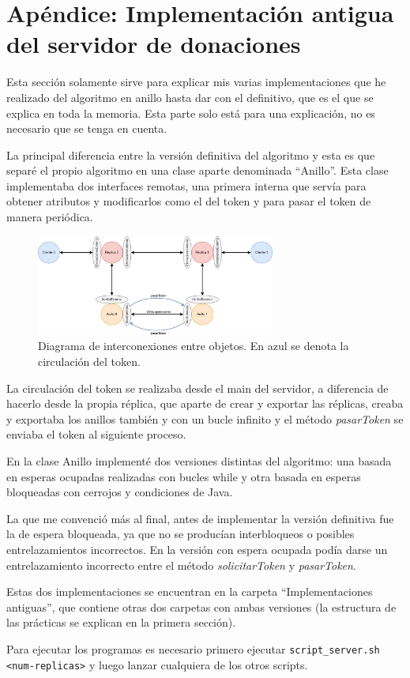 \documentclass{article}
\begin{document}
\newpage

\section{Apéndice: Implementación antigua del servidor de donaciones}
Esta sección solamente sirve para explicar mis varias implementaciones que he realizado del algoritmo en anillo hasta dar con el definitivo, que es el que se explica en toda la memoria. Esta parte solo está para una explicación, no es necesario que se tenga en cuenta.

\bigskip

La principal diferencia entre la versión definitiva del algoritmo y esta es que separé el propio algoritmo en una clase aparte denominada ``Anillo''. Esta clase implementaba dos interfaces remotas, una primera interna que servía para obtener atributos y modificarlos como el del token y para pasar el token de manera periódica.

\begin{figure}[H]
    \centering
    \includegraphics[width=0.7\textwidth]{imagenes/diagramaAnillosSeparados.png}
    \caption{Diagrama de interconexiones entre objetos. En azul se denota la circulación del token.}
\end{figure}

La circulación del token se realizaba desde el main del servidor, a diferencia de hacerlo desde la propia réplica, que aparte de crear y exportar las réplicas, creaba y exportaba los anillos también y con un bucle infinito y el método \textit{pasarToken} se enviaba el token al siguiente proceso.

\bigskip

En la clase Anillo implementé dos versiones distintas del algoritmo: una basada en esperas ocupadas realizadas con bucles while y otra basada en esperas bloqueadas con cerrojos y condiciones de Java.

\bigskip

La que me convenció más al final, antes de implementar la versión definitiva fue la de espera bloqueada, ya que no se producían interbloqueos o posibles entrelazamientos incorrectos. En la versión con espera ocupada podía darse un entrelazamiento incorrecto entre el método \textit{solicitarToken} y \textit{pasarToken}.

Estas dos implementaciones se encuentran en la carpeta ``Implementaciones antiguas'', que contiene otras dos carpetas con ambas versiones (la estructura de las prácticas se explican en la primera sección).

\bigskip

Para ejecutar los programas es necesario primero ejecutar \verb|script_server.sh <num-replicas>| y luego lanzar cualquiera de los otros scripts.
\end{document}
